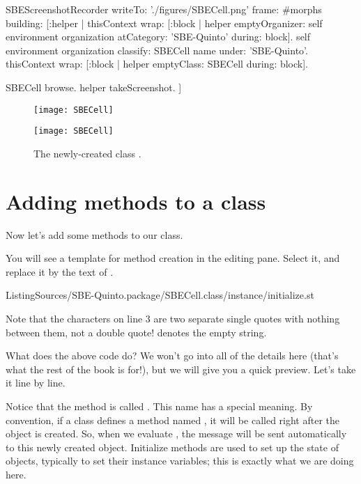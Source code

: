 \documentclass[a4paper,10pt,twoside]{book}
\begin{document}

\begin{ExecuteSmalltalkScript}
SBEScreenshotRecorder writeTo: './figures/SBECell.png' frame: #morphs building: [:helper |
	thisContext wrap: [:block |
		helper emptyOrganizer: self environment organization atCategory: 'SBE-Quinto' during: block].
	self environment organization classify: SBECell name under: 'SBE-Quinto'.
	thisContext wrap: [:block |
		helper emptyClass: SBECell during: block].

	SBECell browse.
	helper takeScreenshot.
]
\end{ExecuteSmalltalkScript}
\begin{figure}[h!t]
\ifluluelse
	{\centerline {\texttt{[image: SBECell]}}}
	{\centerline {\texttt{[image: SBECell]}}}
\caption{The newly-created class \label{fig:SBECell}.}
\end{figure}

\section{Adding methods to a class}

Now let's add some methods to our class.

You will see a template for method creation in the editing pane.
Select it, and replace it by the text of .

%
{ListingSources/SBE-Quinto.package/SBECell.class/instance/initialize.st}

\noindent
Note that the characters  on line 3 are two separate single quotes with nothing between them, not a double quote!
 denotes the empty string.


What does the above code do?
We won't go into all of the details here (that's what the rest of the book is for!), but we will give you a quick preview.
Let's take it line by line.

Notice that the method is called .
This name has a special meaning.
By convention, if a class defines a method named , it will be called right after the object is created.
So, when we evaluate , the message  will be sent automatically to this newly created object.
Initialize methods are used to set up the state of objects, typically to set their instance variables; this is exactly what we are doing here.
\end{document}
